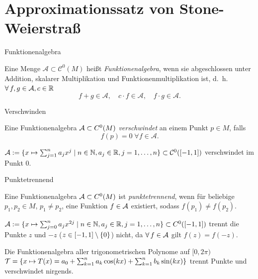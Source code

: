 \section{Approximationssatz von Stone-Weierstraß}

\begin{frame}{Funktionenalgebra}
    \begin{defi}[Funktionenalgebra]
        Eine Menge \( \mathcal{A} \subset \mathcal{C}^0(M) \) heißt 
        \textit{Funktionenalgebra}, wenn sie abgeschlossen unter Addition, 
        skalarer Multiplikation und Funktionenmultiplikation ist, 
        d.~h. \( \forall f,g \in \A, c \in \mathbb{R} \)
        \[ f + g \in \mathcal{A}, \quad c \cdot f \in \mathcal{A}, \quad f \cdot g \in \mathcal{A}. \]
    \end{defi}
\end{frame}

\begin{frame}{Verschwinden}
    \begin{defi}[Verschwinden]
        Eine Funktionenalgebra \(\mathcal{A} \subset C^0(M)\) 
        \textit{verschwindet} an einem Punkt \(p \in M\), falls 
        \[ f(p) = 0 \;\forall f \in \mathcal{A}. \]
    \end{defi}
    \pause
    \begin{bsp}
        \( \mathcal{A} := \{ x \mapsto \sum_{j=1}^n a_j x^j \;|\; n\in \mathbb{N}, a_j \in \mathbb{R}, j = 1,\ldots, n \} \subset \mathcal{C}^0([-1,1]) \) 
        verschwindet im Punkt \(0\).
    \end{bsp}
\end{frame}

\begin{frame}{Punktetrennend}
    \begin{defi}
        Eine Funktionenalgebra \(\mathcal{A} \subset C^0(M)\) ist \textit{punktetrennend}, 
        wenn für beliebige \( p_1, p_2 \in M \), \(p_1 \neq p_2\), 
        eine Funktion \(f \in \mathcal{A}\) existiert, 
        sodass \( f(p_1) \neq f(p_2) \).
    \end{defi}
    \pause
    \begin{bsp}
        \( \mathcal{A} := \{ x \mapsto \sum_{j=0}^n a_{j} x^{2j} \;|\; n\in\mathbb{N}, a_j \in \mathbb{R}, j = 1,\ldots, n \} 
        \subset C^0([-1,1]) \)
        trennt die Punkte \( z \) und \(-z\) (\(z \in [-1,1] \setminus \{0\} \)) nicht, da \( \forall f \in \A \) gilt 
        \( f(z) = f(-z) \).
    \end{bsp}
    \pause
    \begin{bsp}
        Die Funktionenalgebra aller trigonometrischen Polynome auf \( [0,2\pi) \) 
        \(\mathcal{T} = \{x \mapsto T(x) = a_0 + \sum_{k=1}^n a_k \cos(kx) + \sum_{k=1}^n b_k \sin(kx)\}\) 
        trennt Punkte und verschwindet nirgends.
    \end{bsp}
\end{frame}

